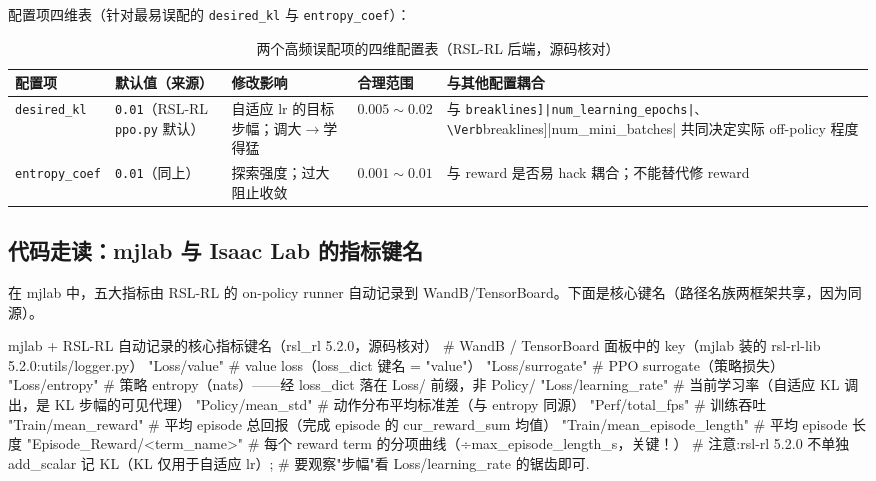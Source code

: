 配置项四维表（针对最易误配的 \verb|desired_kl| 与 \verb|entropy_coef|）：

\begin{table}[H]
\centering
\caption{两个高频误配项的四维配置表（RSL-RL 后端，源码核对）}
\label{tab:rlmc-diag-config4}
\begin{tabular}{p{2.2cm}p{2.4cm}p{3.0cm}p{2.4cm}p{2.6cm}}
\hline
配置项 & 默认值（来源） & 修改影响 & 合理范围 & 与其他配置耦合 \\
\hline
\verb|desired_kl| & \verb|0.01|（RSL-RL \verb|ppo.py| 默认） & 自适应 lr 的目标步幅；调大$\to$学得猛 & $0.005\sim0.02$ & 与 \Verb[breaklines]|num_learning_epochs|、\Verb[breaklines]|num_mini_batches| 共同决定实际 off-policy 程度 \\
\verb|entropy_coef| & \verb|0.01|（同上） & 探索强度；过大阻止收敛 & $0.001\sim0.01$ & 与 reward 是否易 hack 耦合；不能替代修 reward \\
\hline
\end{tabular}
\end{table}


\subsection{代码走读：mjlab 与 Isaac Lab 的指标键名}

在 mjlab 中，五大指标由 RSL-RL 的 on-policy runner 自动记录到 WandB/TensorBoard。下面是核心键名（路径名族两框架共享，因为同源）。

\begin{codebox}[Python]{mjlab + RSL-RL 自动记录的核心指标键名（rsl\_rl 5.2.0，源码核对）}
# WandB / TensorBoard 面板中的 key（mjlab 装的 rsl-rl-lib 5.2.0:utils/logger.py）
"Loss/value"                 # value loss（loss_dict 键名 = "value"）
"Loss/surrogate"             # PPO surrogate（策略损失）
"Loss/entropy"              # 策略 entropy（nats）——经 loss_dict 落在 Loss/ 前缀，非 Policy/
"Loss/learning_rate"         # 当前学习率（自适应 KL 调出，是 KL 步幅的可见代理）
"Policy/mean_std"            # 动作分布平均标准差（与 entropy 同源）
"Perf/total_fps"             # 训练吞吐
"Train/mean_reward"          # 平均 episode 总回报（完成 episode 的 cur_reward_sum 均值）
"Train/mean_episode_length"  # 平均 episode 长度
"Episode_Reward/<term_name>" # 每个 reward term 的分项曲线（÷max_episode_length_s，关键！）
# 注意:rsl-rl 5.2.0 不单独 add_scalar 记 KL（KL 仅用于自适应 lr）;
#       要观察"步幅"看 Loss/learning_rate 的锯齿即可.
\end{codebox}

